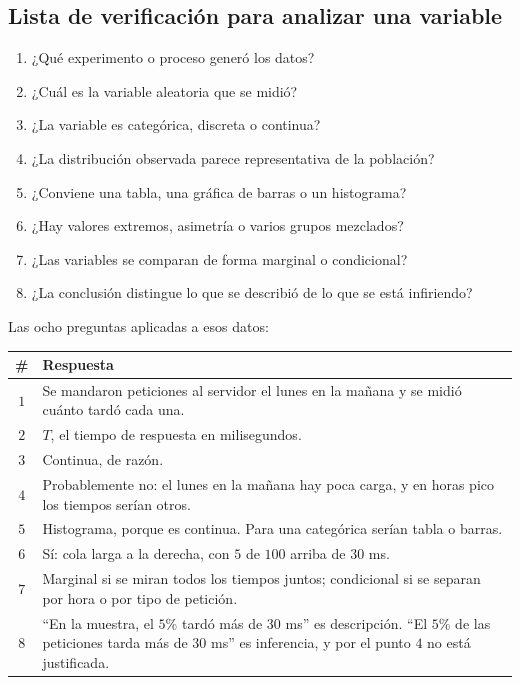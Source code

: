 \documentclass[11pt,letterpaper]{article}
\begin{document}

\subsection*{Lista de verificación para analizar una variable}

\begin{enumerate}[itemsep=0.3em]
    \item ¿Qué experimento o proceso generó los datos?
    \item ¿Cuál es la variable aleatoria que se midió?
    \item ¿La variable es categórica, discreta o continua?
    \item ¿La distribución observada parece representativa de la
          población?
    \item ¿Conviene una tabla, una gráfica de barras o un histograma?
    \item ¿Hay valores extremos, asimetría o varios grupos mezclados?
    \item ¿Las variables se comparan de forma marginal o condicional?
    \item ¿La conclusión distingue lo que se describió de lo que se
          está infiriendo?
\end{enumerate}

\begin{ejemplo}
    Las ocho preguntas aplicadas a esos datos:
    \begin{center}
    \small
    \begin{tabular}{c>{\raggedright\arraybackslash}p{12.2cm}}
        \toprule
        \textbf{\#} & \textbf{Respuesta} \\
        \midrule
        $1$ & Se mandaron peticiones al servidor el lunes en la mañana
              y se midió cuánto tardó cada una. \\
        $2$ & $T$, el tiempo de respuesta en milisegundos. \\
        $3$ & Continua, de razón. \\
        $4$ & Probablemente no: el lunes en la mañana hay poca carga, y
              en horas pico los tiempos serían otros. \\
        $5$ & Histograma, porque es continua. Para una categórica
              serían tabla o barras. \\
        $6$ & Sí: cola larga a la derecha, con $5$ de $100$ arriba de
              $30$ ms. \\
        $7$ & Marginal si se miran todos los tiempos juntos; condicional
              si se separan por hora o por tipo de petición. \\
        $8$ & ``En la muestra, el $5\%$ tardó más de $30$ ms'' es
              descripción. ``El $5\%$ de las peticiones tarda más de
              $30$ ms'' es inferencia, y por el punto $4$ no está
              justificada. \\
        \bottomrule
    \end{tabular}
    \end{center}
\end{ejemplo}
\end{document}
